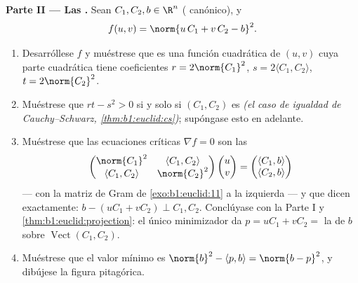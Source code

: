 \begin{problem}
\medskip
\noindent\textbf{Parte II --- Las .} Sean $C_1,
C_2, b \in \R^n$ ( canónico), y
\[
f(u, v) = \norm{u\,C_1 + v\,C_2 - b}^2 .
\]
\begin{enumerate}[resume]
  \item Desarróllese $f$ y muéstrese que es una función cuadrática de $(u,
        v)$ cuya parte cuadrática tiene coeficientes $r = 2\norm{C_1}^2$,
        $s = 2\langle C_1, C_2\rangle$, $t = 2\norm{C_2}^2$.
  \item Muéstrese que $rt - s^2 > 0$ si y solo si $(C_1, C_2)$ es
         \emph{(el caso de igualdad de Cauchy--Schwarz,
        \cref{thm:b1:euclid:cs})}; supóngase esto en adelante.
  \item Muéstrese que las ecuaciones críticas $\nabla f = 0$ son las
        \emph{}
        \[
        \begin{pmatrix}
        \norm{C_1}^2 & \langle C_1, C_2\rangle\\
        \langle C_1, C_2\rangle & \norm{C_2}^2
        \end{pmatrix}
        \begin{pmatrix} u\\ v\end{pmatrix}
        =
        \begin{pmatrix} \langle C_1, b\rangle\\ \langle C_2,
        b\rangle\end{pmatrix}
        \]
        --- con la matriz de Gram de \cref{exo:b1:euclid:11} a la
        izquierda --- y que dicen exactamente: $b - (uC_1 + vC_2)
        \perp C_1, C_2$. Conclúyase con la Parte I y
        \cref{thm:b1:euclid:projection}: el único minimizador
        da $p = uC_1 + vC_2 = $ la  de
        $b$ sobre $\operatorname{Vect}(C_1, C_2)$.
  \item Muéstrese que el valor mínimo es $\norm{b}^2 - \langle p,
        b\rangle = \norm{b - p}^2$, y dibújese la figura
        pitagórica.
\end{enumerate}


\end{problem}
